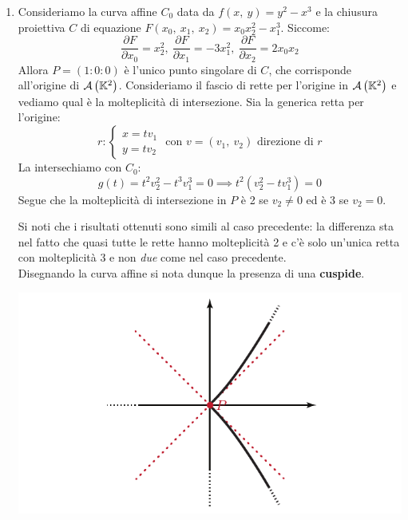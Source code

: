 \begin{examples}
\begin{enumerate}
		\item	Consideriamo la curva affine $C_0$ data da $f\left(x,\ y\right)=y^2-x^3$ e la chiusura proiettiva $C$ di equazione $F(x_0,\ x_1,\ x_2)=x_0x_2^2-x_1^3$. Siccome:
		\begin{equation*}
			\frac{\partial{F}}{\partial{x_0}} =x_2^2,\ \frac{\partial{F}}{\partial{x_1}}= -3x_1^2,\ \frac{\partial{F}}{\partial{x_2}}= 2x_0x_2
		\end{equation*}
		Allora $P=(1\colon 0\colon 0)$ è l'unico punto singolare di $C$, che corrisponde all'origine di ${\mathcal{A}\left(\mathbb{K}^2\right)}$. Consideriamo il fascio di rette per l'origine in ${\mathcal{A}\left(\mathbb{K}^2\right)}$ e vediamo qual è la molteplicità di intersezione. Sia la generica retta per l'origine:
		\begin{equation*}
			r\colon \begin{cases}
				x=tv_1 \\
				y=tv_2
			\end{cases}\text{ con } v=(v_1,\ v_2)\text{ direzione di }r
		\end{equation*}
		La intersechiamo con $C_0$:
		\begin{equation*}
			g(t)=t^2v_2^2 -t^3v_1^3=0 \implies t^2(v_2^2 -tv_1^3)=0
		\end{equation*}
		Segue che la molteplicità di intersezione in $P$ è 2 se $v_2\neq 0$ ed è 3 se $v_2=0$.
		\begin{minipage}{0.65\textwidth}
			Si noti che i risultati ottenuti sono simili al caso precedente: la differenza sta nel fatto che quasi tutte le rette hanno molteplicità 2 e c'è solo un'unica retta con molteplicità 3 e non \textit{due} come nel caso precedente.\\
			Disegnando la curva affine si nota dunque la presenza di una \textbf{cuspide}.
		\end{minipage}
		\hspace{-12mm}
		\begin{minipage}{0.34\textwidth}
			\includegraphics[trim=0cm 0cm 0cm 0cm,clip,scale=0.50]{images/planecurve3.pdf}
		\end{minipage}
	\end{enumerate}
\end{examples}
